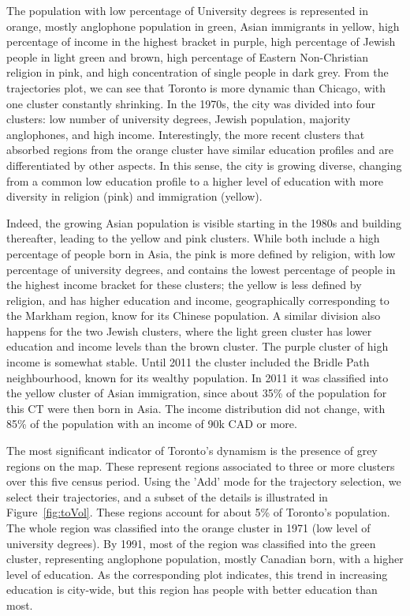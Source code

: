 The population with low percentage of University degrees is represented in
orange, mostly anglophone population in green, Asian immigrants in yellow, high
percentage of income in the highest bracket in purple, high percentage of Jewish
people in light green and brown, high percentage of Eastern Non-Christian
religion in pink, and high concentration of single people in dark grey. From the
trajectories plot, we can see that Toronto is more dynamic than Chicago, with
one cluster constantly shrinking. In the 1970s, the city was divided into four
clusters: low number of university degrees, Jewish population, majority
anglophones, and high income. Interestingly, the more recent clusters that
absorbed regions from the orange cluster have similar education profiles and are
differentiated by other aspects. In this sense, the city is growing diverse,
changing from a common low education profile to a higher level of education with
more diversity in religion (pink) and immigration (yellow).


Indeed, the growing Asian population is visible starting in the 1980s and
building thereafter, leading to the yellow and pink clusters. While both include
a high percentage of people born in Asia, the pink is more defined by religion,
with low percentage of university degrees, and contains the lowest percentage of
people in the highest income bracket for these clusters; the yellow is less
defined by religion, and has higher education and income, geographically
corresponding to the Markham region, know for its Chinese population. A similar
division also happens for the two Jewish clusters, where the light green cluster
has lower education and income levels than the brown cluster. The purple cluster
of high income is somewhat stable. Until 2011 the cluster included the Bridle Path
neighbourhood, known for its wealthy population. In 2011 it was
classified into the yellow cluster of Asian immigration, since about 35\% of the
population for this CT were then born in Asia. The income distribution did not
change, with 85\% of the population with an income of 90k CAD or more.


The most significant indicator of Toronto's dynamism is the presence of grey
regions on the map. These represent regions associated to three or more clusters
over this five census period. Using the 'Add' mode for the trajectory selection,
we select their trajectories, and a subset of the details is illustrated in
Figure~\ref{fig:toVol}. These regions account for about 5\% of Toronto's
population. The whole region was classified into the orange cluster in 1971 (low
level of university degrees). By 1991, most of the region was classified into
the green cluster, representing anglophone population, mostly Canadian born,
with a higher level of education. As the corresponding plot indicates, this
trend in increasing education is city-wide, but this region has people with
better education than most.

